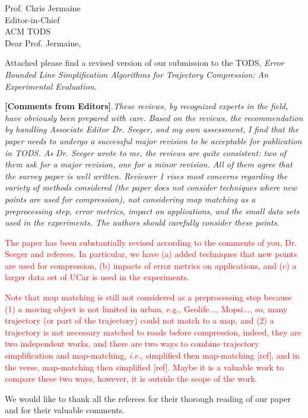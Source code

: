 \documentclass{letter}
\newcommand{\ie}{\emph{i.e.,}\xspace}
\begin{document}
Prof. {Chris Jermaine} \\
Editor-in-Chief		\\
ACM TODS	\\



Dear Prof. Jermaine,

Attached please find a revised version of our submission to
the TODS, \emph{Error Bounded Line Simplification Algorithms for Trajectory Compression: An Experimental Evaluation}.


\textbf{[Comments from Editors]}.\emph{These reviews, by recognized experts in the field, have obviously been prepared with care. Based on the reviews, the recommendation by handling Associate Editor Dr. Seeger, and my own assessment, I find that the paper needs to undergo a successful major revision to be acceptable for publication in TODS. As Dr. Seeger wrote to me, the reviews are quite consistent: two of them ask for a major revision, one for a minor revision. All of them agree that the survey paper is well written. Reviewer 1 rises most concerns regarding the variety of methods considered (the paper does not consider techniques where new points are used for compression), not considering map matching as a preprocessing step, error metrics, impact on applications, and the small data sets used in the experiments. The authors should carefully consider these points.}


\textcolor{red}{The paper has been substantially revised according to the comments of you, Dr. Seeger and referees. In particular, we have (a) added techniques that new points are used for compression, (b) impacts of error metrics on applications, and (c) a larger data set of UCar is used in the experiments.}

\textcolor{red}{Note that map matching is still not considered as a preprocessing step because (1) a moving object is not limited in urban, e.g., Geolife..., Mopsi..., so, many trajectory (or part of the trajectory) could not match to a map, and (2) a trajectory is not necessary matched to roads before compression, indeed, they are two independent works, and there are two ways to combine trajectory simplification and map-matching, \ie simplified then map-matching [ref], and in the verse, map-matching then simplified [ref]. Maybe it is a valuable work to compare these two ways, however, it is outside the scope of the work.}


We would like to thank all the referees for their thorough reading of our paper and for their valuable comments.
\end{document}
